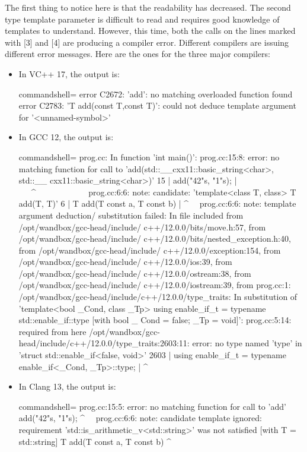 The first thing to notice here is that the readability has decreased. The second type template parameter is difficult to read and requires good knowledge of templates to understand. However, this time, both the calls on the lines marked with [3] and [4] are producing a compiler error. Different compilers are issuing different error messages. Here are the ones for the three major compilers:

\begin{itemize}
\item
In VC++ 17, the output is:

\begin{tcblisting}{commandshell={}}
error C2672: 'add': no matching overloaded function found
error C2783: 'T add(const T,const T)': could not deduce
template argument for '<unnamed-symbol>'
\end{tcblisting}

\item
In GCC 12, the output is:
\begin{tcblisting}{commandshell={}}
prog.cc: In function 'int main()':
prog.cc:15:8: error: no matching function for call
to 'add(std::__cxx11::basic_string<char>, std::__
cxx11::basic_string<char>)'
15 |         add("42"s, "1"s);
   |       ~~~^~~~~~~~~~~~~
prog.cc:6:6: note: candidate: 'template<class T, class> T
add(T, T)'
6 | T add(T const a, T const b)
  |     ^~~
prog.cc:6:6: note: template argument deduction/
substitution failed:
In file included from /opt/wandbox/gcc-head/include/
c++/12.0.0/bits/move.h:57,
                 from /opt/wandbox/gcc-head/include/
c++/12.0.0/bits/nested_exception.h:40,
                 from /opt/wandbox/gcc-head/include/
c++/12.0.0/exception:154,
                 from /opt/wandbox/gcc-head/include/
c++/12.0.0/ios:39,
                 from /opt/wandbox/gcc-head/include/
c++/12.0.0/ostream:38,
                 from /opt/wandbox/gcc-head/include/
c++/12.0.0/iostream:39,
                 from prog.cc:1:
/opt/wandbox/gcc-head/include/c++/12.0.0/type_traits: In
substitution of 'template<bool _Cond, class _Tp> using
enable_if_t = typename std::enable_if::type [with bool _
Cond = false; _Tp = void]':
prog.cc:5:14: required from here
/opt/wandbox/gcc-head/include/c++/12.0.0/type_traits:2603:11:
error: no type named 'type' in 'struct std::enable_if<false, 
void>'
2603 | using enable_if_t = typename enable_if<_Cond, _Tp>::type;
     |            ^~~~~~~~~~~
\end{tcblisting}

\item
In Clang 13, the output is:
\begin{tcblisting}{commandshell={}}
prog.cc:15:5: error: no matching function for call to
'add'
    add("42"s, "1"s);
    ^~~
prog.cc:6:6: note: candidate template ignored:
requirement 'std::is_arithmetic_v<std::string>' was not
satisfied [with T = std::string]
   T add(T const a, T const b)
      ^
\end{tcblisting}
\end{itemize}

